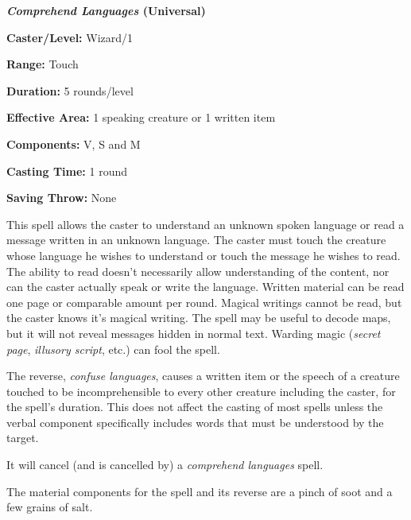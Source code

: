 \begin{multicols}{2}
\vspace{1em}

\noindent
\begin{minipage}{\columnwidth}

\noindent \textbf{\textit{Comprehend Languages} (Universal)}

\noindent \textbf{Caster/Level:} Wizard/1

\noindent \textbf{Range:} Touch

\noindent \textbf{Duration:} 5 rounds/level

\noindent \textbf{Effective Area:} 1 speaking creature or 1 written item

\noindent \textbf{Components:} V, S and M

\noindent \textbf{Casting Time:} 1 round

\noindent \textbf{Saving Throw:} None

\end{minipage}

This spell allows the caster to understand an unknown spoken language or read a message written in an unknown language.  The caster must touch the creature whose language he wishes to understand or touch the message he wishes to read.  The ability to read doesn't necessarily allow understanding of the content, nor can the caster actually speak or write the language.  Written material can be read one page or comparable amount per round.  Magical writings cannot be read, but the caster knows it's magical writing.  The spell may be useful to decode maps, but it will not reveal messages hidden in normal text.  Warding magic (\textit{secret page}, \textit{illusory script}, etc.) can fool the spell.

The reverse, \textit{confuse languages}, causes a written item or the speech of a creature touched to be incomprehensible to every other creature including the caster, for the spell's duration.  This does not affect the casting of most spells unless the verbal component specifically includes words that must be understood by the target.  

It will cancel (and is cancelled by) a \textit{comprehend languages} spell.

The material components for the spell and its reverse are a pinch of soot and a few grains of salt.

\vspace{1em}

\noindent
\begin{minipage}{\columnwidth}


\end{minipage}
\end{multicols}
